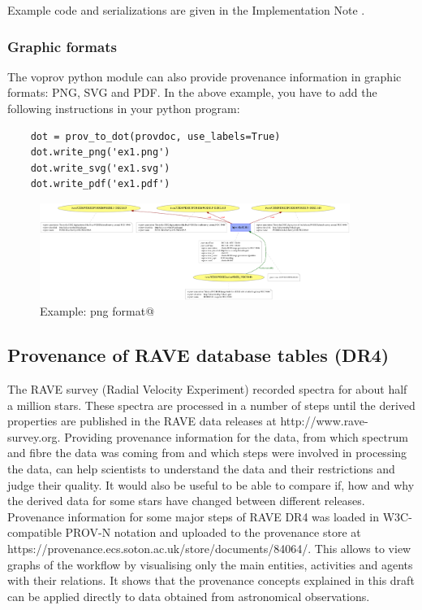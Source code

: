 Example code and serializations are given in the Implementation Note \citep{std:ProvenanceImplementationNote}.


\subsubsection{Graphic formats}
\label{sec:graphic_formats}
The voprov python module can also provide provenance information in graphic formats: PNG, SVG and PDF.
In the above example, you have to add the following instructions in your python program:

\begin{verbatim}
    dot = prov_to_dot(provdoc, use_labels=True)
    dot.write_png('ex1.png')
    dot.write_svg('ex1.svg')
    dot.write_pdf('ex1.pdf')
\end{verbatim}

\begin{figure}
\centering
\includegraphics[width=0.9\textwidth]{access_ex1.png}
\caption{Example: png format@}
\label{fig:example}
\end{figure}



\subsection{Provenance of RAVE database tables (DR4)}
The RAVE survey (Radial Velocity Experiment) recorded spectra for about half a 
million stars. These spectra are processed in a number of steps until the 
derived properties are published in the RAVE data releases at http://www.rave-survey.org.
Providing provenance information for the data, from which spectrum and fibre the
data was coming from and which steps were involved in processing the data, can help scientists
to understand the data and their restrictions and judge their quality.
It would also be useful to be able to compare if, how and why the derived data 
for some stars have changed between different releases.
Provenance information for some major steps of RAVE DR4 was loaded in 
W3C-compatible PROV-N notation and uploaded to the provenance store at 
https://provenance.ecs.soton.ac.uk/store/documents/84064/. This allows to view 
graphs of the workflow by visualising only the main entities, activities and agents 
with their relations. It shows that the provenance concepts explained in this draft 
can be applied directly to data obtained from astronomical observations.


